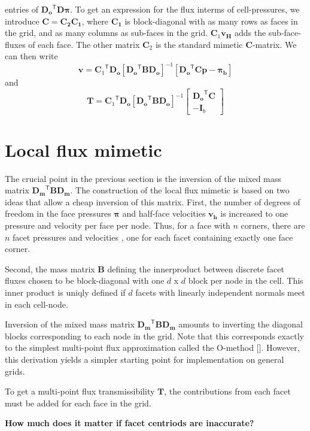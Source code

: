 \documentclass[11pt,fleqn]{amsart}
\newcommand{\vect}[1]{\boldsymbol{#1}}
\newcommand{\mat}[1]{\boldsymbol{#1}}
\newcommand{\transp}[1]{{#1}^{\ensuremath{\mathsf{T}}}}
\begin{document}
entries of $\transp{\mat{D_o}}\mat{D}\vect{\pi}$.  To get an
expression for the flux interms of cell-pressures, we introduce
$\mat{C} = \mat{C_2}\mat{C_1}$, where $\mat{C_1}$ is block-diagonal
with as many rows as faces in the grid, and as many columns as
sub-faces in the grid.  $\mat{C}_1\vect{v_H}$ adds the sub-face-fluxes
of each face.  The other matrix $\mat{C}_2$ is the standard mimetic
$\mat{C}$-matrix.  We can then write 
\begin{equation*}
  \vect{v} = \transp{\mat{C}_1}\mat{D_o}[\transp{\mat{D_o}}\mat{B}\mat{D_o}]^{-1}
             [\transp{\mat{D_o}}\mat{C}\vect{p}-\vect{\pi_b}] 
\end{equation*}
and 
\begin{equation*}
  \mat{T} = \transp{\mat{C}_1}\mat{D_o}[\transp{\mat{D_o}}\mat{B}\mat{D_o}]^{-1}
             \begin{bmatrix}\transp{\mat{D_o}}\mat{C}\\-\mat{I}_b\end{bmatrix}
\end{equation*}

\section{Local flux mimetic}
The crucial point in the previous section is the inversion of the
mixed mass matrix $\transp{\mat{D_m}}\mat{B}\mat{D_m}$.  The
construction of the local flux mimetic is based on two ideas that
allow a cheap inversion of this matrix.  First, the number of degrees
of freedom in the face pressures $\vect{\pi}$ and half-face velocities
$\vect{v_h}$ is increased to one pressure and velocity per face per
node. Thus, for a face with $n$ corners, there are $n$ facet pressures
and velocities , one for each facet containing exactly one face
corner.

Second, the mass matrix $\mat{B}$ defining the innerproduct between
discrete facet fluxes chosen to be block-diagonal with one $d$ x $d$
block per node in the cell.  This inner product is uniqly defined if
$d$ facets with linearly independent normals meet in each cell-node.

Inversion of the mixed mass matrix
$\transp{\mat{D_m}}\mat{B}\mat{D_m}$ amounts to inverting the diagonal
blocks corresponding to each node in the grid.  Note that this
corresponds exactly to the simplest multi-point flux approximation
called the O-method [].  However, this derivation yields a simpler
starting point for implementation on general grids.

To get a multi-point flux transmissibility $\mat{T}$, the
contributions from each facet must be added for each face in the grid.





{\bf How much does it matter if facet centriods are inaccurate?}



\end{document}
